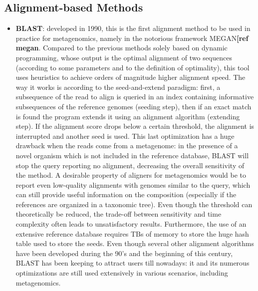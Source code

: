 \subsection{Alignment-based Methods}
\begin{itemize}
    \item \textbf{BLAST}: developed in 1990, this is the first alignment method to be used in practice for metagenomics, namely in the notorious framework MEGAN\textbf{[ref megan}. Compared to the previous methods solely based on dynamic programming, whose output is the optimal alignment of two sequences (according to some parameters and to the definition of optimality), this tool uses heuristics to achieve orders of magnitude higher alignment speed. The way it works is according to the seed-and-extend paradigm: first, a subsequence of the read to align is queried in an index containing informative subsequences of the reference genomes (seeding step), then if an exact match is found the program extends it using an alignment algorithm (extending step). If the alignment score drops below a certain threshold, the alignment is interrupted and another seed is used. This last optimization has a huge drawback when the reads come from a metagenome: in the presence of a novel organism which is not included in the reference database, BLAST will stop the query reporting no alignment, decreasing the overall sensitivity of the method. A desirable property of aligners for metagenomics would be to report even low-quality alignments with genomes similar to the query, which can still provide useful information on the composition (especially if the references are organized in a taxonomic tree). Even though the threshold can theoretically be reduced, the trade-off between sensitivity and time complexity often leads to unsatisfactory results. Furthermore, the use of an extensive reference database requires TBs of memory to store the huge hash table used to store the seeds. Even though several other alignment algorithms have been developed during the 90's and the beginning of this century, BLAST has been keeping to attract users till nowadays: it and its numerous optimizations are still used extensively in various scenarios, including metagenomics.

\end{itemize}
